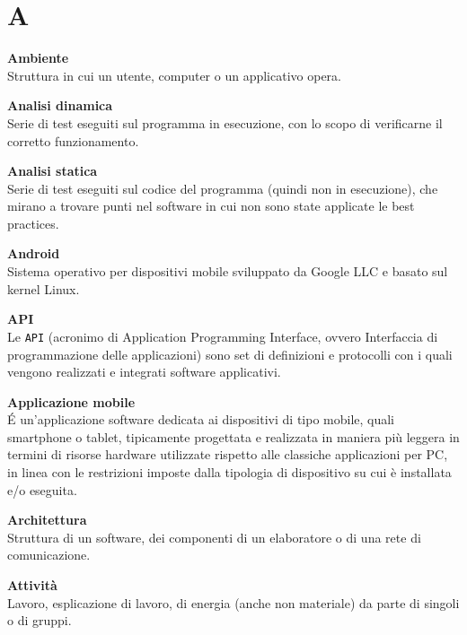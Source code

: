 \documentclass[a4paper, oneside, openany, dvipsnames, table, 12pt]{article}
\begin{document}
\copertina{}

\renewcommand{\arraystretch}{1.5}


\newpage
\tableofcontents
\newpage

\newpage
\section{A}  
\textbf{Ambiente} \\
Struttura in cui un utente, computer o un applicativo opera.

\textbf{Analisi dinamica} \\
Serie di test eseguiti sul programma in esecuzione, con lo scopo di verificarne il corretto funzionamento.  

\textbf{Analisi statica} \\
Serie di test eseguiti sul codice del programma (quindi non in esecuzione), che mirano a trovare punti nel software in cui non sono state applicate le best practices\glo.

\textbf{Android} \\
Sistema operativo per dispositivi mobile sviluppato da Google LLC e basato sul kernel Linux.

\textbf{API} \\
Le \texttt{API} (acronimo di Application Programming Interface, ovvero Interfaccia di programmazione delle applicazioni) sono set di definizioni e protocolli con i quali vengono realizzati e integrati software applicativi. 

\textbf{Applicazione mobile} \\
\'E un'applicazione software dedicata ai dispositivi di tipo mobile, quali smartphone o tablet, tipicamente progettata e realizzata in maniera più leggera in termini di risorse hardware utilizzate rispetto alle classiche applicazioni per PC, in linea con le restrizioni imposte dalla tipologia di dispositivo su cui è installata e/o eseguita. 

\textbf{Architettura} \\
Struttura di un software, dei componenti di un elaboratore o di una rete di comunicazione.

\textbf{Attività} \\
Lavoro, esplicazione di lavoro, di energia (anche non materiale) da parte di singoli o di gruppi.
\end{document}
